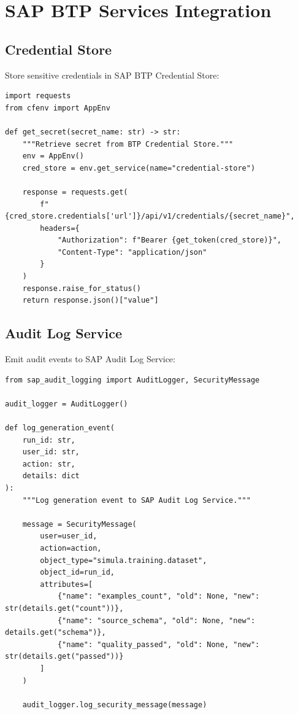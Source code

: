 \section{SAP BTP Services Integration}

\subsection{Credential Store}

Store sensitive credentials in SAP BTP Credential Store:

\begin{lstlisting}[language=jsonx,caption={Retrieving secrets from BTP Credential Store}]
import requests
from cfenv import AppEnv

def get_secret(secret_name: str) -> str:
    """Retrieve secret from BTP Credential Store."""
    env = AppEnv()
    cred_store = env.get_service(name="credential-store")
    
    response = requests.get(
        f"{cred_store.credentials['url']}/api/v1/credentials/{secret_name}",
        headers={
            "Authorization": f"Bearer {get_token(cred_store)}",
            "Content-Type": "application/json"
        }
    )
    response.raise_for_status()
    return response.json()["value"]
\end{lstlisting}

\subsection{Audit Log Service}

Emit audit events to SAP Audit Log Service:

\begin{lstlisting}[language=jsonx,caption={Audit logging integration}]
from sap_audit_logging import AuditLogger, SecurityMessage

audit_logger = AuditLogger()

def log_generation_event(
    run_id: str,
    user_id: str,
    action: str,
    details: dict
):
    """Log generation event to SAP Audit Log Service."""
    
    message = SecurityMessage(
        user=user_id,
        action=action,
        object_type="simula.training.dataset",
        object_id=run_id,
        attributes=[
            {"name": "examples_count", "old": None, "new": str(details.get("count"))},
            {"name": "source_schema", "old": None, "new": details.get("schema")},
            {"name": "quality_passed", "old": None, "new": str(details.get("passed"))}
        ]
    )
    
    audit_logger.log_security_message(message)
\end{lstlisting}

